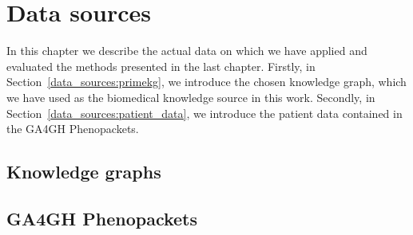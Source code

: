 \chapter{Data sources}\label{data_sources}
In this chapter we describe the actual data on which we have applied and evaluated the methods presented in the last chapter. Firstly, in Section~\ref{data_sources:primekg}, we introduce the chosen knowledge graph, which we have used as the biomedical knowledge source in this work. Secondly, in Section~\ref{data_sources:patient_data}, we introduce the patient data contained in the GA4GH Phenopackets.

\section{Knowledge graphs}\label{data_sources:kgs}
% 



\section{GA4GH Phenopackets}\label{data_sources:phenopackets}
